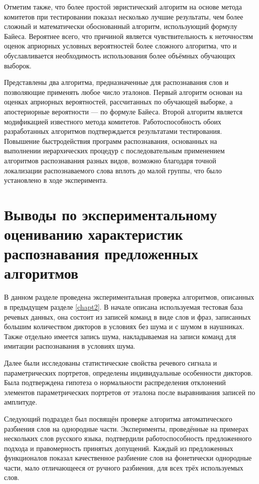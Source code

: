 Отметим также, что более простой эвристический алгоритм на основе метода комитетов при тестировании показал несколько лучшие результаты, чем более сложный и математически обоснованный алгоритм, использующий формулу Байеса.
Вероятнее всего, что причиной является чувствительность к неточностям оценок априорных условных вероятностей более сложного алгоритма, что и обуславливается необходимость использования более объёмных обучающих выборок.

Представлены два алгоритма, предназначенные для распознавания слов и позволяющие применять любое число эталонов.
Первый алгоритм основан на оценках априорных вероятностей, рассчитанных по обучающей выборке, а апостериорные вероятности --- по формуле Байеса.
Второй алгоритм является модификацией известного метода комитетов.
Работоспособность обоих разработанных алгоритмов подтверждается результатами тестирования.
Повышение быстродействия программ распознавания, основанных на выполнении иерархических процедур с последовательным применением алгоритмов распознавания разных видов, возможно благодаря точной локализации распознаваемого слова вплоть до малой группы, что было установлено в ходе эксперимента.


\section{Выводы по экспериментальному оцениванию характеристик распознавания предложенных алгоритмов} \label{sect3_6}

В данном разделе проведена экспериментальная проверка алгоритмов, описанных в предыдущем разделе \ref{chapt2}.
В начале описана используемая тестовая база речевых данных, она состоит из записей команд в виде слов и фраз, записанных большим количеством дикторов в условиях без шума и с шумом в наушниках.
Также отдельно имеется запись шума, накладываемая на записи команд для имитации распознавания в условиях шума.

Далее были исследованы статистические свойства речевого сигнала и параметрических портретов, определены индивидуальные особенности дикторов.
Была подтверждена гипотеза о нормальности распределения отклонений элементов параметрических портретов от эталона после выравнивания записей по амплитуде.

Следующий подраздел был посвящён проверке алгоритма автоматического разбиения слов на однородные части.
Эксперименты, проведённые на примерах нескольких слов русского языка, подтвердили работоспособность предложенного подхода и правомерность принятых допущений.
Каждый из предложенных функционалов показал качественное разбиение слов на фонетически однородные части, мало отличающееся от ручного разбиения, для всех трёх используемых слов.

